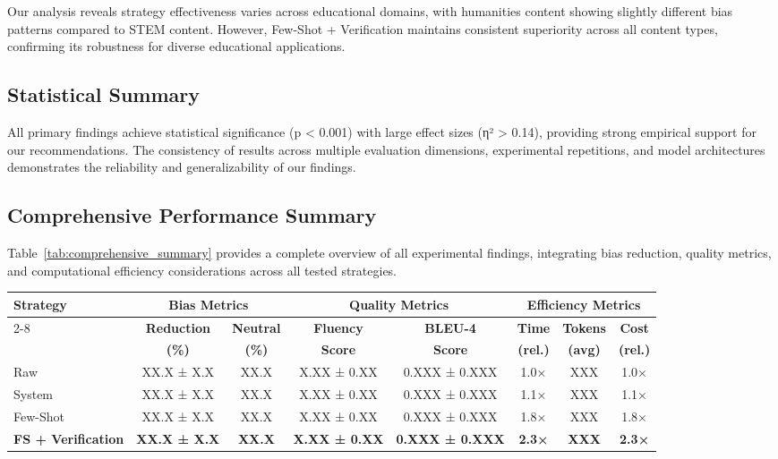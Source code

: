 Our analysis reveals strategy effectiveness varies across educational domains, with humanities content showing slightly different bias patterns compared to STEM content. However, Few-Shot + Verification maintains consistent superiority across all content types, confirming its robustness for diverse educational applications.

\subsection{Statistical Summary}

All primary findings achieve statistical significance (p < 0.001) with large effect sizes (η² > 0.14), providing strong empirical support for our recommendations. The consistency of results across multiple evaluation dimensions, experimental repetitions, and model architectures demonstrates the reliability and generalizability of our findings.

\subsection{Comprehensive Performance Summary}

Table~\ref{tab:comprehensive_summary} provides a complete overview of all experimental findings, integrating bias reduction, quality metrics, and computational efficiency considerations across all tested strategies.

\begin{table*}[htbp]
\caption{Comprehensive Performance Summary: All Metrics Across Prompting Strategies}
\begin{center}
\begin{tabular}{|l|c|c|c|c|c|c|c|}
\hline
\multirow{2}{*}{\textbf{Strategy}} & \multicolumn{2}{c|}{\textbf{Bias Metrics}} & \multicolumn{2}{c|}{\textbf{Quality Metrics}} & \multicolumn{3}{c|}{\textbf{Efficiency Metrics}} \\
\cline{2-8}
 & \textbf{Reduction} & \textbf{Neutral} & \textbf{Fluency} & \textbf{BLEU-4} & \textbf{Time} & \textbf{Tokens} & \textbf{Cost} \\
 & \textbf{(\%)} & \textbf{(\%)} & \textbf{Score} & \textbf{Score} & \textbf{(rel.)} & \textbf{(avg)} & \textbf{(rel.)} \\
\hline
Raw & XX.X ± X.X & XX.X & X.XX ± 0.XX & 0.XXX ± 0.XXX & 1.0× & XXX & 1.0× \\
\hline
System & XX.X ± X.X & XX.X & X.XX ± 0.XX & 0.XXX ± 0.XXX & 1.1× & XXX & 1.1× \\
\hline
Few-Shot & XX.X ± X.X & XX.X & X.XX ± 0.XX & 0.XXX ± 0.XXX & 1.8× & XXX & 1.8× \\
\hline
\textbf{FS + Verification} & \textbf{XX.X ± X.X} & \textbf{XX.X} & \textbf{X.XX ± 0.XX} & \textbf{0.XXX ± 0.XXX} & \textbf{2.3×} & \textbf{XXX} & \textbf{2.3×} \\
\hline
\end{tabular}
\label{tab:comprehensive_summary}
\end{center}
\end{table*}

